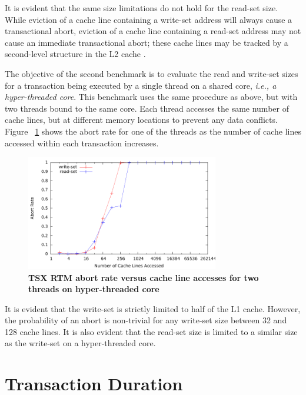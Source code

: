 \documentclass[11pt]{book}
\begin{document}
It is evident that the same size limitations do not hold for the read-set size.
While eviction of a cache line containing a write-set address will always cause a
transactional abort, eviction of a cache line containing a read-set address may not cause
an immediate transactional abort; these cache lines may be tracked by a second-level
structure in the L2 cache \cite{intel_opt_man}.

The objective of the second benchmark is to evaluate the read and write-set
sizes for a transaction being executed by a single thread on a shared core,
\emph{i.e., a hyper-threaded core}.  This benchmark uses the same procedure as
above, but with two threads bound to the same core.  Each thread accesses the
same number of cache lines, but at different memory locations to prevent any
data conflicts. Figure ~\ref{fig:trx_size_ht} shows the abort rate for one of
the threads as the number of cache lines accessed within each transaction
increases.

\begin{figure}[H]
    \centering
    \graphicspath{ {./figures/} }
    \includegraphics[width=0.75\textwidth,keepaspectratio]{trxSize_hyperthreaded}
    \caption{\textbf{TSX RTM abort rate versus cache line accesses for two 
    threads on hyper-threaded core}}
    \label{fig:trx_size_ht}
\end{figure}

It is evident that the write-set is strictly limited to half of the L1 cache.  However,
the probability of an abort is non-trivial for any write-set size between 32 and 128 cache
lines.  It is also evident that the read-set size is limited to a similar size as the
write-set on a hyper-threaded core.

\section{Transaction Duration}
\end{document}
